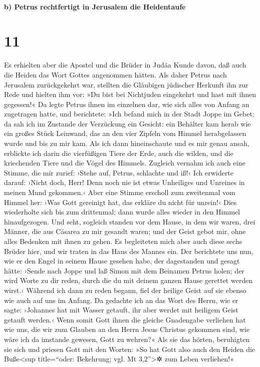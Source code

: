 \hypertarget{b-petrus-rechtfertigt-in-jerusalem-die-heidentaufe}{%
\paragraph{b) Petrus rechtfertigt in Jerusalem die
Heidentaufe}\label{b-petrus-rechtfertigt-in-jerusalem-die-heidentaufe}}

\hypertarget{section-10}{%
\section{11}\label{section-10}}

 Es erhielten aber die Apostel und die Brüder in Judäa
Kunde davon, daß auch die Heiden das Wort Gottes angenommen hätten.
 Als daher Petrus nach Jerusalem zurückgekehrt war,
stellten die Gläubigen jüdischer Herkunft ihn zur Rede 
und hielten ihm vor: »Du bist bei Nichtjuden eingekehrt und hast mit
ihnen gegessen!«  Da legte Petrus ihnen im einzelnen dar,
wie sich alles von Anfang an zugetragen hatte, und berichtete:
 »Ich befand mich in der Stadt Joppe im Gebet; da sah ich
im Zustande der Verzückung ein Gesicht: ein Behälter kam herab wie ein
großes Stück Leinwand, das an den vier Zipfeln vom Himmel herabgelassen
wurde und bis zu mir kam.  Als ich dann hineinschaute und
es mir genau ansah, erblickte ich darin die vierfüßigen Tiere der Erde,
auch die wilden, und die kriechenden Tiere und die Vögel des Himmels.
 Zugleich vernahm ich auch eine Stimme, die mir zurief:
›Stehe auf, Petrus, schlachte und iß!‹  Ich erwiderte
darauf: ›Nicht doch, Herr! Denn noch nie ist etwas Unheiliges und
Unreines in meinen Mund gekommen.‹  Aber eine Stimme
erscholl zum zweitenmal vom Himmel her: ›Was Gott gereinigt hat, das
erkläre du nicht für unrein!‹  Dies wiederholte sich bis
zum drittenmal; dann wurde alles wieder in den Himmel hinaufgezogen.
 Und seht, sogleich standen vor dem Hause, in dem wir
waren, drei Männer, die aus Cäsarea zu mir gesandt waren;
 und der Geist gebot mir, ohne alles Bedenken mit ihnen
zu gehen. Es begleiteten mich aber auch diese sechs Brüder hier, und wir
traten in das Haus des Mannes ein.  Der berichtete uns
nun, wie er den Engel in seinem Hause gesehen habe, der dagestanden und
gesagt hätte: ›Sende nach Joppe und laß Simon mit dem Beinamen Petrus
holen;  der wird Worte zu dir reden, durch die du mit
deinem ganzen Hause gerettet werden wirst.‹  Während ich
dann zu reden begann, fiel der heilige Geist auf sie ebenso wie auch auf
uns im Anfang.  Da gedachte ich an das Wort des Herrn,
wie er sagte: ›Johannes hat mit Wasser getauft, ihr aber werdet mit
heiligem Geist getauft werden.‹  Wenn somit Gott ihnen
die gleiche Gnadengabe verliehen hat wie uns, die wir zum Glauben an den
Herrn Jesus Christus gekommen sind, wie wäre ich da imstande gewesen,
Gott zu wehren?«  Als sie das hörten, beruhigten sie sich
und priesen Gott mit den Worten: »So hat Gott also auch den Heiden die
Buße\textless sup title=``oder: Bekehrung; vgl. Mt 3,2''\textgreater✲
zum Leben verliehen!«

